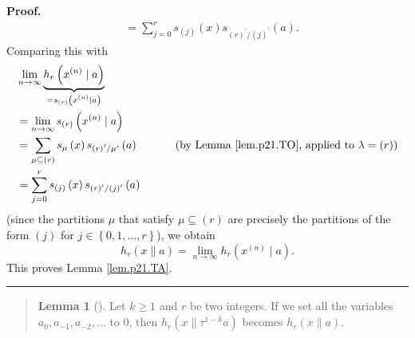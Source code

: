\documentclass[numbers=enddot,12pt,final,onecolumn,notitlepage]{scrartcl}%
\newenvironment{statement}{\begin{quote}}{\end{quote}}
\theoremstyle{definition}
\newtheorem{lem}[theo]{Lemma}
\newenvironment{lemmain}[1][]
{\begin{statement}\begin{lem}[#1]}
{\end{lem}\end{statement}}
\newenvironment{proof}[1][Proof]{\noindent\textbf{#1.} }{\ \rule{0.5em}{0.5em}}
\newenvironment{lemmain}[1][Proof]{\noindent\textbf{#1.} }{\ \rule{0.5em}{0.5em}}
\let\sumnonlimits\sum
\renewcommand{\sum}{\sumnonlimits\limits}
\begin{document}
\begin{enumerate}
\begin{proof}
\begin{align*}
&  =\sum_{j=0}^{r}s_{\left(  j\right)  }\left(  x\right)  s_{\left(  r\right)
^{\prime}/\left(  j\right)  ^{\prime}}\left(  a\right)  .
\end{align*}
Comparing this with%
\begin{align*}
&  \lim\limits_{n\rightarrow\infty}\underbrace{h_{r}\left(  x^{\left(
n\right)  }\mid a\right)  }_{\substack{=s_{\left(  r\right)  }\left(
x^{\left(  n\right)  }\mid a\right)  }}\\
&  =\lim\limits_{n\rightarrow\infty}s_{\left(  r\right)  }\left(  x^{\left(
n\right)  }\mid a\right) \\
&  =\sum_{\mu\subseteq\left(  r\right)  }s_{\mu}\left(  x\right)  s_{\left(
r\right)  ^{\prime}/\mu^{\prime}}\left(  a\right)  \ \ \ \ \ \ \ \ \ \ \left(
\text{by Lemma \ref{lem.p21.TO}, applied to }\lambda=\left(  r\right)  \right)
\\
&  =\sum_{j=0}^{r}s_{\left(  j\right)  }\left(  x\right)  s_{\left(  r\right)
^{\prime}/\left(  j\right)  ^{\prime}}\left(  a\right)
\end{align*}
(since the partitions $\mu$ that satisfy $\mu\subseteq\left(  r\right)  $ are
precisely the partitions of the form $\left(  j\right)  $ for $j\in\left\{
0,1,\ldots,r\right\}  $), we obtain%
\[
h_{r}\left(  x\parallel a\right)  =\lim\limits_{n\rightarrow\infty}%
h_{r}\left(  x^{\left(  n\right)  }\mid a\right)  .
\]
This proves Lemma \ref{lem.p21.TA}.
\end{proof}

\begin{lemmain}
\label{lem.p21.TB}Let $k\geq1$ and $r$ be two integers. If we set all the
variables $a_{0},a_{-1},a_{-2},\ldots$ to $0$, then $h_{r}\left(
x\parallel\tau^{1-k}a\right)  $ becomes $h_{r}\left(  x\parallel a\right)  $.
\end{lemmain}


\end{enumerate}
\end{document}
